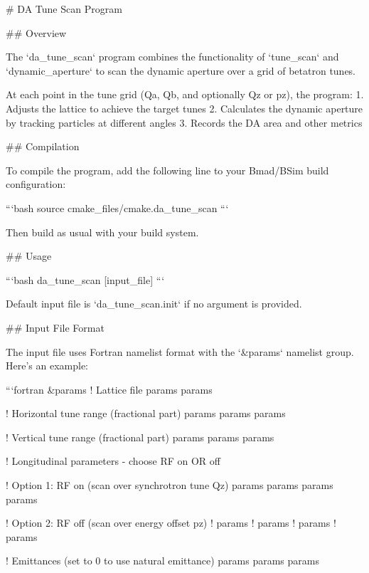 # DA Tune Scan Program

## Overview

The `da_tune_scan` program combines the functionality of `tune_scan` and `dynamic_aperture` to scan the dynamic aperture over a grid of betatron tunes. 

At each point in the tune grid (Qa, Qb, and optionally Qz or pz), the program:
1. Adjusts the lattice to achieve the target tunes
2. Calculates the dynamic aperture by tracking particles at different angles
3. Records the DA area and other metrics

## Compilation

To compile the program, add the following line to your Bmad/BSim build configuration:

```bash
source cmake_files/cmake.da_tune_scan
```

Then build as usual with your build system.

## Usage

```bash
da_tune_scan [input_file]
```

Default input file is `da_tune_scan.init` if no argument is provided.

## Input File Format

The input file uses Fortran namelist format with the `&params` namelist group. Here's an example:

```fortran
&params
  ! Lattice file
  params%
  params%
  
  ! Horizontal tune range (fractional part)
  params%
  params%
  params%
  
  ! Vertical tune range (fractional part)
  params%
  params%
  params%
  
  ! Longitudinal parameters - choose RF on OR off
  
  ! Option 1: RF on (scan over synchrotron tune Qz)
  params%
  params%
  params%
  params%
  
  ! Option 2: RF off (scan over energy offset pz)
  ! params%
  ! params%
  ! params%
  ! params%
  
  ! Emittances (set to 0 to use natural emittance)
  params%
  params%
  params%
  
